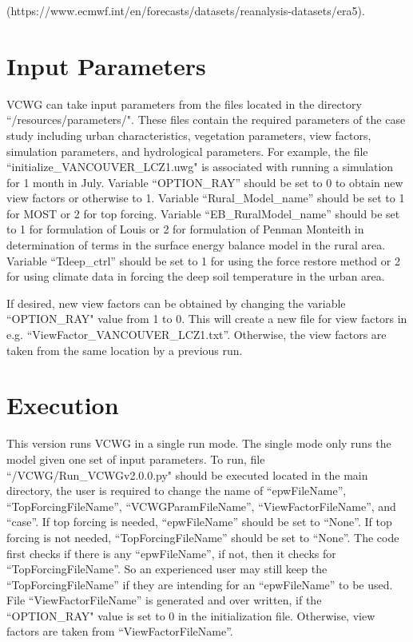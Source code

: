 \documentclass[12pt]{article}
\begin{document}
(https://www.ecmwf.int/en/forecasts/datasets/reanalysis-datasets/era5).

\section{Input Parameters}

VCWG can take input parameters from the files located in the directory ``/resources/parameters/". These files contain the required parameters of the case study including urban characteristics, vegetation parameters, view factors, simulation parameters, and hydrological parameters. For example, the file ``initialize\_VANCOUVER\_LCZ1.uwg" is associated with running a simulation for 1 month in July. Variable ``OPTION\_RAY'' should be set to 0 to obtain new view factors or otherwise to 1. Variable ``Rural\_Model\_name'' should be set to 1 for MOST or 2 for top forcing. Variable ``EB\_RuralModel\_name'' should be set to 1 for formulation of Louis or 2 for formulation of Penman Monteith in determination of terms in the surface energy balance model in the rural area. Variable ``Tdeep\_ctrl'' should be set to 1 for using the force restore method or 2 for using climate data in forcing the deep soil temperature in the urban area.

If desired, new view factors can be obtained by changing the variable ``OPTION\_RAY" value from 1 to 0. This will create a new file for view factors in e.g. ``ViewFactor\_VANCOUVER\_LCZ1.txt''. Otherwise, the view factors are taken from the same location by a previous run.

\section{Execution}

This version runs VCWG in a single run mode. The single mode only runs the model given one set of input parameters. To run, file ``/VCWG/Run\_VCWGv2.0.0.py" should be executed located in the main directory, the user is required to change the name of ``epwFileName'', ``TopForcingFileName'', ``VCWGParamFileName'', ``ViewFactorFileName'', and ``case''. If top forcing is needed, ``epwFileName'' should be set to ``None''. If top forcing is not needed, ``TopForcingFileName'' should be set to ``None''. The code first checks if there is any ``epwFileName'', if not, then it checks for ``TopForcingFileName''. So an experienced user may still keep the ``TopForcingFileName'' if they are intending for an ``epwFileName'' to be used. File ``ViewFactorFileName'' is generated and over written, if the ``OPTION\_RAY" value is set to 0 in the initialization file. Otherwise, view factors are taken from ``ViewFactorFileName''.
\end{document}

